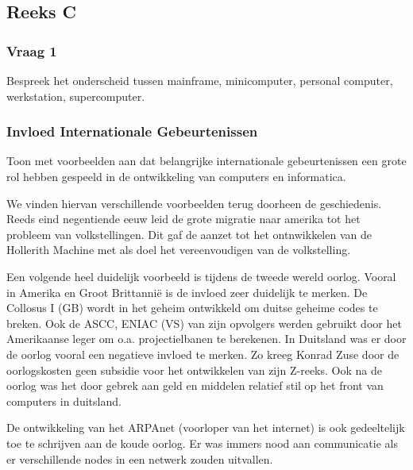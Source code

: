 \documentclass[../main.tex]{subfiles}
\begin{document}
\subsection{Reeks C}
\subsubsection{Vraag 1}
\begin{question}
Bespreek het onderscheid tussen mainframe, minicomputer, personal computer, werkstation, supercomputer.
\end{question}
\begin{solution}
\end{solution}

\subsubsection{Invloed Internationale Gebeurtenissen}
\begin{question}
Toon met voorbeelden aan dat belangrijke internationale gebeurtenissen een grote rol hebben gespeeld in de ontwikkeling van computers en informatica.
\end{question}
\begin{solution}
		We vinden hiervan verschillende voorbeelden terug doorheen de geschiedenis.
		Reeds eind negentiende eeuw leid de grote migratie naar amerika tot het probleem van volkstellingen.
		Dit gaf de aanzet tot het ontnwikkelen van de Hollerith Machine met als doel het vereenvoudigen van de volkstelling.

		Een volgende heel duidelijk voorbeeld is tijdens de tweede wereld oorlog.
		Vooral in Amerika en Groot Brittanni\"e is de invloed zeer duidelijk te merken. 
		De Collosus I (GB) wordt in het geheim ontwikkeld om duitse geheime codes te breken. 
		Ook de ASCC, ENIAC (VS) van zijn opvolgers werden gebruikt door het Amerikaanse leger om o.a. projectielbanen te berekenen. 
		In Duitsland was er door de oorlog vooral een negatieve invloed te merken.
		Zo kreeg Konrad Zuse door de oorlogskosten geen subsidie voor het ontwikkelen van zijn Z-reeks.
		Ook na de oorlog was het door gebrek aan geld en middelen relatief stil op het front van computers in duitsland.	

		De ontwikkeling van het ARPAnet (voorloper van het internet) is ook gedeeltelijk toe te schrijven aan de koude oorlog. 
		Er was immers nood aan communicatie als er verschillende nodes in een netwerk zouden uitvallen.
\end{solution}
\end{document}
